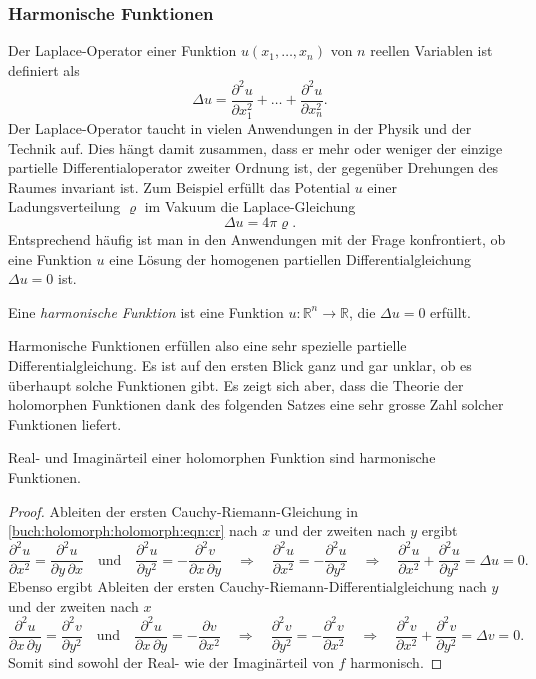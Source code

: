 %
%
\subsubsection{Harmonische Funktionen}
Der Laplace-Operator einer Funktion $u(x_1,\dots,x_n)$ von $n$
%
reellen Variablen ist definiert als
\[
\Delta u
=
\frac{\partial^2u}{\partial x_1^2}
+
\dots
+
\frac{\partial^2u}{\partial x_n^2}.
\]
Der Laplace-Operator taucht in vielen Anwendungen in der Physik und
der Technik auf.
Dies hängt damit zusammen, dass er mehr oder weniger der einzige
partielle Differentialoperator zweiter Ordnung ist, der gegenüber
Drehungen des Raumes invariant ist.
Zum Beispiel erfüllt das Potential $u$ einer Ladungsverteilung $\varrho$ im
%
%
Vakuum die Laplace-Glei\-chung
\[
\Delta u = 4\pi \varrho.
\]
Entsprechend häufig ist man in den Anwendungen mit der Frage konfrontiert,
ob eine Funktion $u$ eine Lösung der homogenen partiellen Differentialgleichung
$\Delta u=0$ ist.

\begin{definition}
Eine \emph{harmonische Funktion} ist eine Funktion
$u\colon\mathbb{R}^n\to\mathbb{R}$, die $\Delta u = 0$ erfüllt.
%
\end{definition}

Harmonische Funktionen erfüllen also eine sehr spezielle partielle
Differentialgleichung.
Es ist auf den ersten Blick ganz und gar unklar, ob es überhaupt
solche Funktionen gibt.
Es zeigt sich aber, dass die Theorie der holomorphen Funktionen
dank des folgenden Satzes eine sehr grosse Zahl solcher Funktionen
liefert.

\begin{satz}
\label{buch:holomorph:holomorph:satz:harmonisch}
Real- und Imaginärteil einer holomorphen Funktion sind harmonische
Funktionen.
\end{satz}

\begin{proof}
Ableiten der ersten Cauchy-Riemann-Gleichung in
\eqref{buch:holomorph:holomorph:eqn:cr}
nach $x$ und der zweiten nach $y$ ergibt
\[
\frac{\partial^2 u}{\partial x^2}
=
\frac{\partial^2 u}{\partial y\,\partial x}
\quad\text{und}\quad
\frac{\partial^2 u}{\partial y^2}
=
-
\frac{\partial^2 v}{\partial x\,\partial y}
\quad\Rightarrow\quad
\frac{\partial^2 u}{\partial x^2}=-\frac{\partial^2 u}{\partial y^2}
\quad\Rightarrow\quad
\frac{\partial^2 u}{\partial x^2} + \frac{\partial^2 u}{\partial y^2}
=
\Delta u
=
0.
\]
Ebenso ergibt Ableiten der ersten Cauchy-Riemann-Differentialgleichung nach
$y$ und der zweiten nach $x$
\[
\frac{\partial^2 u}{\partial x\,\partial y}
=
\frac{\partial^2 v}{\partial y^2}
\quad\text{und}\quad
\frac{\partial^2 u}{\partial x\,\partial y}
=
-
\frac{\partial v}{\partial x^2}
\quad\Rightarrow\quad
\frac{\partial^2 v}{\partial y^2}
=
-
\frac{\partial^2 v}{\partial x^2}
\quad\Rightarrow\quad
\frac{\partial^2 v}{\partial x^2}
+
\frac{\partial^2 v}{\partial y^2}
=
\Delta v
=
0.
\]
Somit sind sowohl der Real- wie der Imaginärteil von $f$ harmonisch.
\end{proof}

